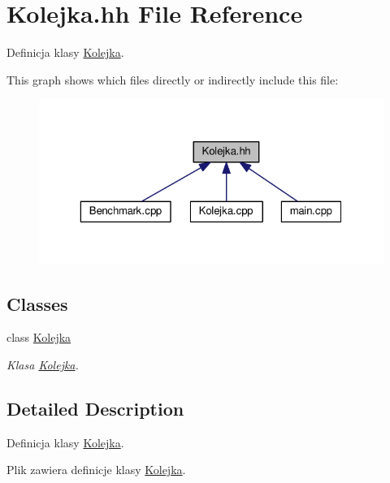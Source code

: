 \hypertarget{a00011}{}\section{Kolejka.\+hh File Reference}
\label{a00011}


Definicja klasy \hyperlink{a00003}{Kolejka}.  


This graph shows which files directly or indirectly include this file\+:\nopagebreak
\begin{figure}[H]
\begin{center}
\leavevmode
\includegraphics[width=325pt]{a00025}
\end{center}
\end{figure}
\subsection*{Classes}
\begin{DoxyCompactItemize}
\item 
class \hyperlink{a00003}{Kolejka}
\begin{DoxyCompactList}\small\item\em Klasa \hyperlink{a00003}{Kolejka}. \end{DoxyCompactList}\end{DoxyCompactItemize}


\subsection{Detailed Description}
Definicja klasy \hyperlink{a00003}{Kolejka}. 

Plik zawiera definicje klasy \hyperlink{a00003}{Kolejka}. 